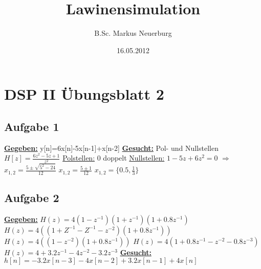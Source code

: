 \documentclass[12pt]{scrreprt}
\title{Lawinensimulation}
\author{B.Sc. Markus Neuerburg}
\date{16.05.2012}
\begin{document}
\setlength{\topmargin}{0cm}
\parindent 0pt
\section*{DSP II Übungsblatt 2}
\subsection*{Aufgabe 1}
\underline{\textbf{Gegeben:}}\newline
\hspace*{5mm}y[n]=6x[n]-5x[n-1]+x[n-2]\newline
\newline
\underline{\textbf{Gesucht:}}\newline
\hspace*{5mm}Pol- und Nullstellen\newline
\newline
\hspace*{5mm}$H[z]=\frac{6z^2 - 5z + 1}{z^2}$
\hspace*{5mm}\underline{Polstellen:}\newline
\hspace*{5mm}0 doppelt\newline
\hspace*{5mm}\underline{Nullstellen:}\newline
\hspace*{5mm}$1-5z+6z^2=0$\newline
\hspace*{5mm}$\Rightarrow$ $x_{1,2}=\frac{5 \pm \sqrt{5^2 - 24}}{12}$\newline
\hspace*{5mm}$x_{1,2}=\frac{5 \pm 1}{12}$\newline
\hspace*{5mm}$x_{1,2}=\{0.5, \frac{1}{3}\}$

\subsection*{Aufgabe 2}
\underline{\textbf{Gegeben:}}\newline
\hspace*{5mm}$H(z)=4(1-z^{-1})(1+z^{-1})(1+0.8z^{-1})$\newline
\hspace*{5mm}$H(z)=4((1+Z^{-1}-Z^{-1}-z^{-2})(1+0.8z^{-1}))$\newline
\hspace*{5mm}$H(z)=4((1-z^{-2})(1+0.8z^{-1}))$\newline
\hspace*{5mm}$H(z)=4(1+0.8z^{-1} - z^{-2} -0.8z^{-3} )$\newline
\hspace*{5mm}$H(z)=4+3.2z^{-1} - 4z^{-2} - 3.2z^{-3}$\newline
\underline{\textbf{Gesucht:}}\newline
\hspace*{5mm}$h[n]=-3.2x[n-3] - 4x[n-2] + 3.2x[n-1] + 4x[n]$
\end{document}
